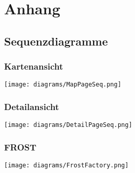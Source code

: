 \section{Anhang}
\subsection{Sequenzdiagramme}
\subsubsection*{Kartenansicht}
\texttt{[image: diagrams/MapPageSeq.png]}

\subsubsection*{Detailansicht}
\texttt{[image: diagrams/DetailPageSeq.png]}

\subsubsection*{FROST}
\texttt{[image: diagrams/FrostFactory.png]}